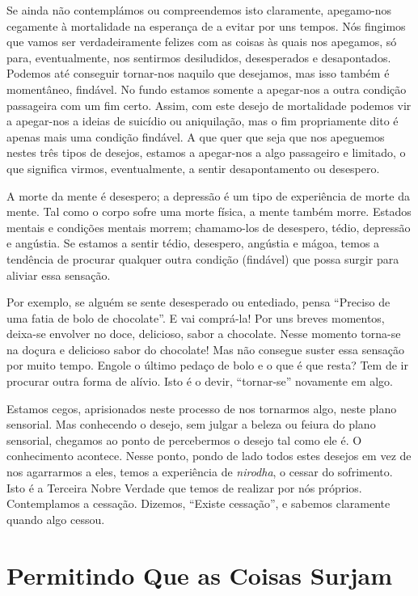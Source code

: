 Se ainda não contemplámos ou compreendemos isto claramente, apegamo-nos
cegamente à mortalidade na esperança de a evitar por uns tempos. Nós fingimos
que vamos ser verdadeiramente felizes com as coisas às quais nos apegamos, só
para, eventualmente, nos sentirmos desiludidos, desesperados e desapontados.
Podemos até conseguir tornar-nos naquilo que desejamos, mas isso também é
momentâneo, findável. No fundo estamos somente a apegar-nos a outra condição
passageira com um fim certo. Assim, com este desejo de mortalidade podemos vir a
apegar-nos a ideias de suicídio ou aniquilação, mas o fim propriamente dito é
apenas mais uma condição findável. A que quer que seja que nos apeguemos nestes
três tipos de desejos, estamos a apegar-nos a algo passageiro e limitado, o que
significa virmos, eventualmente, a sentir desapontamento ou desespero.

A morte da mente é desespero; a depressão é um tipo de experiência de morte da
mente. Tal como o corpo sofre uma morte física, a mente também morre. Estados
mentais e condições mentais morrem; chamamo-los de desespero, tédio, depressão e
angústia. Se estamos a sentir tédio, desespero, angústia e mágoa, temos a
tendência de procurar qualquer outra condição (findável) que possa surgir para
aliviar essa sensação.

Por exemplo, se alguém se sente desesperado ou entediado, pensa “Preciso de uma
fatia de bolo de chocolate”. E vai comprá-la! Por uns breves momentos, deixa-se
envolver no doce, delicioso, sabor a chocolate. Nesse momento torna-se na doçura
e delicioso sabor do chocolate! Mas não consegue suster essa sensação por muito
tempo. Engole o último pedaço de bolo e o que é que resta? Tem de ir procurar
outra forma de alívio. Isto é o devir, “tornar-se” novamente em algo.

Estamos cegos, aprisionados neste processo de nos tornarmos algo, neste plano
sensorial. Mas conhecendo o desejo, sem julgar a beleza ou feiura do plano
sensorial, chegamos ao ponto de percebermos o desejo tal como ele é. O
conhecimento acontece. Nesse ponto, pondo de lado todos estes desejos em vez de
nos agarrarmos a eles, temos a experiência de \emph{nirodha}, o cessar do
sofrimento. Isto é a Terceira Nobre Verdade que temos de realizar por nós
próprios. Contemplamos a cessação. Dizemos, “Existe cessação”, e sabemos
claramente quando algo cessou.

\section{Permitindo Que as Coisas Surjam}

